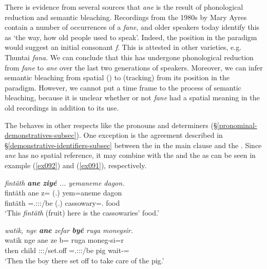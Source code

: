There is evidence from several sources that \emph{ane} is the result of phonological reduction and semantic bleaching. Recordings from the 1980s by Mary Ayres contain a number of occurrences of a  \emph{fane}, and older speakers today identify this as `the way, how old people used to speak'. Indeed, the position in the paradigm would suggest an initial consonant \emph{f}. This is attested in other  varieties, e.g.  Thuntai \emph{fana}. We can conclude that this  has undergone phonological reduction from \emph{fane} to \emph{ane} over the last two generations of speakers. Moreover, we can infer semantic bleaching from spatial () to  (tracking) from its position in the paradigm. However, we cannot put a time frame to the process of semantic bleaching, because it is unclear whether or not \emph{fane} had a spatial meaning in the old recordings in addition to its  use.

The   behaves in other respects like the  pronouns and determiners ({\S}\ref{pronominal-demonstratives-subsec}). One exception is the agreement described in {\S}\ref{demonstrative-identifiers-subsec} between the  in the main clause and the  . Since \emph{ane} has no spatial reference, it may combine with the  and the    as can be seen in example (\ref{ex092}) and (\ref{ex091}), respectively.

\begin{exe}
	\ex \emph{fintäth \textbf{ane} \textbf{ziyé} ... yemaneme dagon.}\\
	\gll fintäth ane z= (.) yem=aneme dagon\\
	fintäth {\Dem} \Prox=\Tsg.\Masc:\Sbj:\Nonpast:\Ipfv/be (.) cassowary={\Poss}.{\Nsg} food\\
	\trans `This \emph{fintäth} (fruit) here is the cassowaries' food.'
	\label{ex092}
\end{exe}
\begin{exe}
	\ex \emph{watik, nge \textbf{ane} zefar \textbf{byé} ruga monegsir.}\\
	\gll watik nge ane ze b= ruga moneg-si=r\\
	then child {\Dem} \Stsg:\Sbj:\Rpst:\Pfv/set.off \Med{}=\Tsg.\Masc:\Sbj:\Nonpast:\Ipfv/be pig wait-{\Nmlz}={\Purp}\\
	\trans `Then the boy there set off to take care of the pig.' 
	\label{ex091}
\end{exe}

